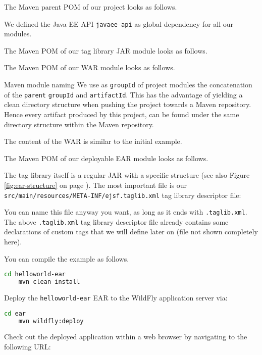 The Maven parent POM of our project looks as follows.

We defined the Java EE API \texttt{javaee-api} as global dependency for all our modules.

The Maven POM of our tag library JAR module looks as follows.


The Maven POM of our WAR module looks as follows.

\begin{TIP}{Maven module naming}
	We use as \texttt{groupId} of project modules the concatenation	of the \texttt{parent} \texttt{groupId} and \texttt{artifactId}.
	This has the advantage of yielding a clean directory structure when pushing the project towards a Maven repository.
	Hence every artifact produced by this project, can be found under the same directory structure within the Maven repository.
\end{TIP}

The content of the WAR is similar to the initial example.

The Maven POM of our deployable EAR module looks as follows.


The tag library itself is a regular JAR with a specific structure (see also Figure \ref{fig:ear-structure} on page \pageref{fig:ear-structure}).
The most important file is our \texttt{src/main/resources/META-INF/ejsf.taglib.xml} tag library descriptor file:

You can name this file anyway you want, as long as it ends with \texttt{.taglib.xml}.
The above \texttt{.taglib.xml} tag library descriptor file already contains some declarations of custom tags that we will define later on (file not shown completely here).

You can compile the example as follows.
\begin{lstlisting}[language=bash]
	cd helloworld-ear
	mvn clean install
\end{lstlisting}

Deploy the \texttt{helloworld-ear} EAR to the WildFly application server via:
\begin{lstlisting}[language=bash]
	cd ear
	mvn wildfly:deploy
\end{lstlisting}

Check out the deployed application within a web browser by navigating to the following URL:

